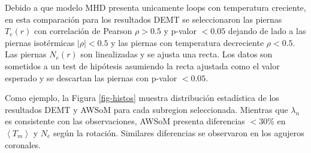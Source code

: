 \documentclass[baaa]{baaa}
\begin{document}
Debido a que modelo MHD presenta unicamente loops con temperatura creciente, en esta comparación para los resultados DEMT se seleccionaron las piernas $T_e(r)$ con correlación de Pearson $\rho > 0.5$ y p-valor $< 0.05$ dejando de lado a las piernas isotérmicas $\left | \rho \right | < 0.5$ y las piernas con temperatura decreciente $\rho < 0.5$. Las piernas $N_e(r)$ son linealizadas y se ajusta una recta. Los datos son sometidos a un test de hipótesis asumiendo la recta ajustada como el valor esperado y se descartan las piernas con p-valor $<0.05$.


Como ejemplo, la Figura \ref{fig-histos} muestra distribución estadística de los resultados DEMT y AWSoM para cada subregion seleccionada. Mientras que $\lambda_n$ es consistente con las observaciones, AWSoM presenta diferencias $<30\%$ en $\left<T_m\right>$ y $N_e$ según la rotación. Similares diferencias se observaron en los agujeros coronales.
\end{document}
